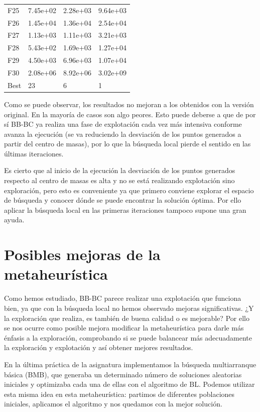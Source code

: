 \begin{table}[H]
\begin{minipage}{.5\linewidth}
\begin{tabular}{llll}
        F25  &  7.45e+02 &   2.28e+03 &  9.64e+03 \\
        F26  &  1.45e+04 &   1.36e+04 &  2.54e+04 \\
        F27  &  1.13e+03 &   1.11e+03 &  3.21e+03 \\
        F28  &  5.43e+02 &   1.69e+03 &  1.27e+04 \\
        F29  &  4.50e+03 &   6.96e+03 &  1.07e+04 \\
        F30  &  2.08e+06 &   8.92e+06 &  3.02e+09 \\
        Best &        23 &          6 &         1 \\
        \bottomrule
        \end{tabular}
        
    \end{minipage} 
\end{table}

\newpage
Como se puede observar, los resultados no mejoran a los obtenidos con la versión original. En la mayoría de casos son algo peores. Esto puede deberse a que de por sí BB-BC ya realiza una fase de explotación cada vez más intensiva conforme avanza la ejecución (se va reduciendo la desviación de los puntos generados a partir del centro de masas), por lo que la búsqueda local pierde el sentido en las últimas iteraciones. 

Es cierto que al inicio de la ejecución la desviación de los puntos generados respecto al centro de masas es alta y no se está realizando explotación sino exploración, pero esto es conveniente ya que primero conviene explorar el espacio de búsqueda y conocer dónde se puede encontrar la solución óptima. Por ello aplicar la búsqueda local en las primeras iteraciones tampoco supone una gran ayuda.

\section{Posibles mejoras de la metaheurística}
Como hemos estudiado, BB-BC parece realizar una explotación que funciona bien, ya que con la búsqueda local no hemos observado mejoras significativas. ¿Y la exploración que realiza, es también de buena calidad o es mejorable? Por ello se nos ocurre como posible mejora modificar la metaheurística para darle más énfasis a la exploración, comprobando si se puede balancear más adecuadamente la exploración y explotación y así obtener mejores resultados.

En la última práctica de la asignatura implementamos la búsqueda multiarranque básica (BMB), que generaba un determinado número de soluciones aleatorias iniciales y optimizaba cada una de ellas con el algoritmo de BL. Podemos utilizar esta misma idea en esta metaheurística: partimos de diferentes poblaciones iniciales, aplicamos el algoritmo y nos quedamos con la mejor solución.


